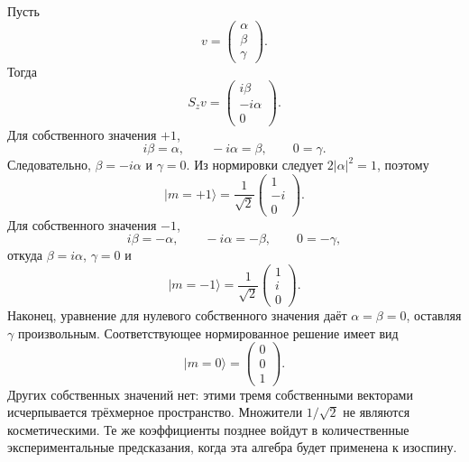 Пусть
\begin{equation}
v=
\begin{pmatrix}
\alpha\\
\beta\\
\gamma
\end{pmatrix}.
\end{equation}
Тогда
\begin{equation}
S_zv
=
\begin{pmatrix}
i\beta\\
-i\alpha\\
0
\end{pmatrix}.
\end{equation}
Для собственного значения \(+1\),
\begin{equation}
i\beta=\alpha,
\qquad
-i\alpha=\beta,
\qquad
0=\gamma.
\end{equation}
Следовательно, \(\beta=-i\alpha\) и \(\gamma=0\). Из нормировки следует \(2|\alpha|^2=1\), поэтому
\begin{equation}
|m=+1\rangle
=
\frac{1}{\sqrt2}
\begin{pmatrix}
1\\
-i\\
0
\end{pmatrix}.
\end{equation}
Для собственного значения \(-1\),
\begin{equation}
i\beta=-\alpha,
\qquad
-i\alpha=-\beta,
\qquad
0=-\gamma,
\end{equation}
откуда \(\beta=i\alpha\), \(\gamma=0\) и
\begin{equation}
|m=-1\rangle
=
\frac{1}{\sqrt2}
\begin{pmatrix}
1\\
i\\
0
\end{pmatrix}.
\end{equation}
Наконец, уравнение для нулевого собственного значения даёт \(\alpha=\beta=0\), оставляя \(\gamma\) произвольным. Соответствующее нормированное решение имеет вид
\begin{equation}
|m=0\rangle
=
\begin{pmatrix}
0\\
0\\
1
\end{pmatrix}.
\end{equation}
Других собственных значений нет: этими тремя собственными векторами исчерпывается трёхмерное пространство. Множители \(1/\sqrt2\) не являются косметическими. Те же коэффициенты позднее войдут в количественные экспериментальные предсказания, когда эта алгебра будет применена к изоспину.


